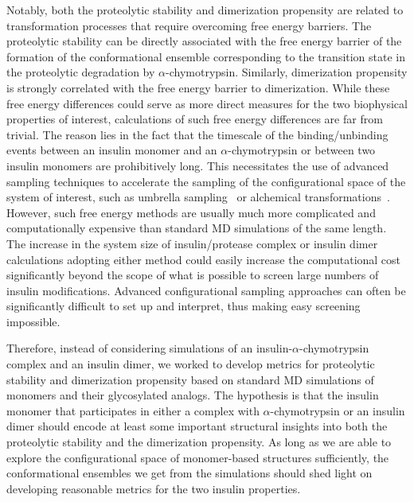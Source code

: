 \documentclass[9pt]{elife}
\begin{document}
Notably, both the proteolytic stability and dimerization propensity are related to transformation processes that require overcoming free energy barriers. The proteolytic stability can be directly associated with the free energy barrier of the formation of the conformational ensemble corresponding to the transition state in the proteolytic degradation by $\alpha$-chymotrypsin. Similarly, dimerization propensity is strongly correlated with the free energy barrier to dimerization. While these free energy differences could serve as more direct measures for the two biophysical properties of interest, calculations of such free energy differences are far from trivial. The reason lies in the fact that the timescale of the binding/unbinding events between an insulin monomer and an $\alpha$-chymotrypsin or between two insulin monomers are prohibitively long. This necessitates the use of advanced sampling techniques to accelerate the sampling of the configurational space of the system of interest, such as umbrella sampling~\cite{torrie1977nonphysical} or alchemical transformations~\cite{sugita2000replica, lyubartsev1992new}. However, such free energy methods are usually much more complicated and computationally expensive than standard MD simulations of the same length. The increase in the system size of insulin/protease complex or insulin dimer calculations adopting either method could easily increase the computational cost significantly beyond the scope of what is possible to screen large numbers of insulin modifications.  Advanced configurational sampling approaches can often be significantly difficult to set up and interpret, thus making easy screening impossible.

Therefore, instead of considering simulations of an insulin-$\alpha$-chymotrypsin complex and an insulin dimer, we worked to develop metrics for proteolytic stability and dimerization propensity based on standard MD simulations of monomers and their glycosylated analogs. The hypothesis is that the insulin monomer that participates in either a complex with $\alpha$-chymotrypsin or an insulin dimer should encode at least some important structural insights into both the proteolytic stability and the dimerization propensity. As long as we are able to explore the configurational space of monomer-based structures sufficiently, the conformational ensembles we get from the simulations should shed light on developing reasonable metrics for the two insulin properties. 
\end{document}

